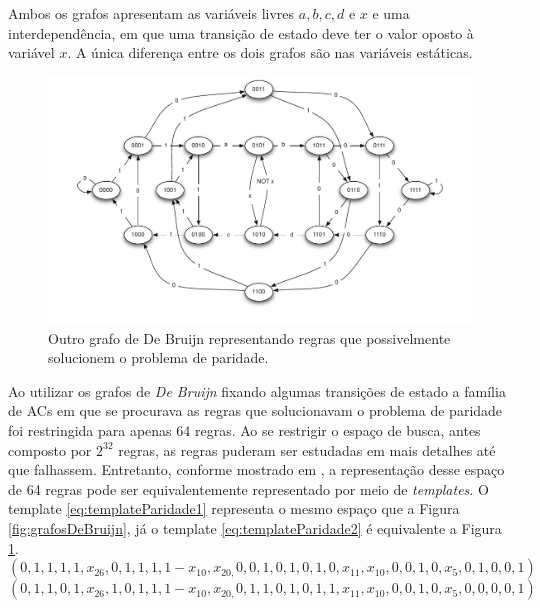 \documentclass[12pt,a4paper]{article}
\begin{document}
Ambos os grafos apresentam as variáveis livres $a, b, c, d \text{ e } x$ e uma interdependência, em que uma transição de estado deve ter o valor oposto à variável $x$. A única diferença entre os dois grafos são nas variáveis estáticas.

\begin{figure}[h!]
  \centering
  \includegraphics[width=1\textwidth]{grafo2.pdf}
    \caption{Outro grafo de De Bruijn representando regras que possivelmente solucionem o problema de paridade.}
    \label{fig:grafosDeBruijn2}
\end{figure}

Ao utilizar os grafos de \textit{De Bruijn} fixando algumas transições de estado a família de ACs em que se procurava as regras que solucionavam o problema de paridade foi restringida para apenas 64 regras. Ao se restrigir o espaço de busca, antes composto por $2^{32}$ regras, as regras puderam ser estudadas em mais detalhes até que falhassem. Entretanto, conforme mostrado em \cite{Verardo2014}, a representação desse espaço de 64 regras pode ser equivalentemente representado por meio de \textit{templates}. O template \ref{eq:templateParidade1} representa o mesmo espaço que a Figura \ref{fig:grafosDeBruijn}, já o template \ref{eq:templateParidade2} é equivalente a Figura \ref{fig:grafosDeBruijn2}.
\begin{equation}
\left(0,1,1,1,1,x_{26},0,1,1,1,1-x_{10},x_{20,}0,0,1,0,1,0,1,0,x_{11},x_{10},0,0,1,0,x_5,0,1,0,0,1\right)
\label{eq:templateParidade1}
\end{equation}
\begin{equation}
\left(0,1,1,0,1,x_{26},1,0,1,1,1-x_{10},x_{20,}0,1,1,0,1,0,1,1,x_{11},x_{10},0,0,1,0,x_5,0,0,0,0,1\right)
\label{eq:templateParidade2}
\end{equation}
\end{document}
